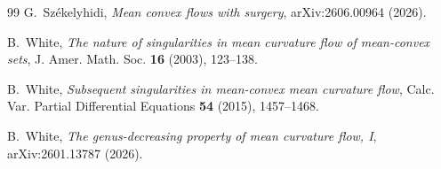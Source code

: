 \documentclass[12pt,twoside,reqno]{amsart}
\theoremstyle{definition}
\theoremstyle{remark}
\numberwithin{equation}{section}
\begin{document}
\begin{thebibliography}{99}
G.~Sz\'ekelyhidi,
\emph{Mean convex flows with surgery},
arXiv:2606.00964 (2026).

B.~White,
\emph{The nature of singularities in mean curvature flow of mean-convex sets},
J. Amer. Math. Soc. \textbf{16} (2003), 123--138.

B.~White,
\emph{Subsequent singularities in mean-convex mean curvature flow},
Calc. Var. Partial Differential Equations \textbf{54} (2015), 1457--1468.

B.~White,
\emph{The genus-decreasing property of mean curvature flow, I},
arXiv:2601.13787 (2026).

\end{thebibliography}
\end{document}
